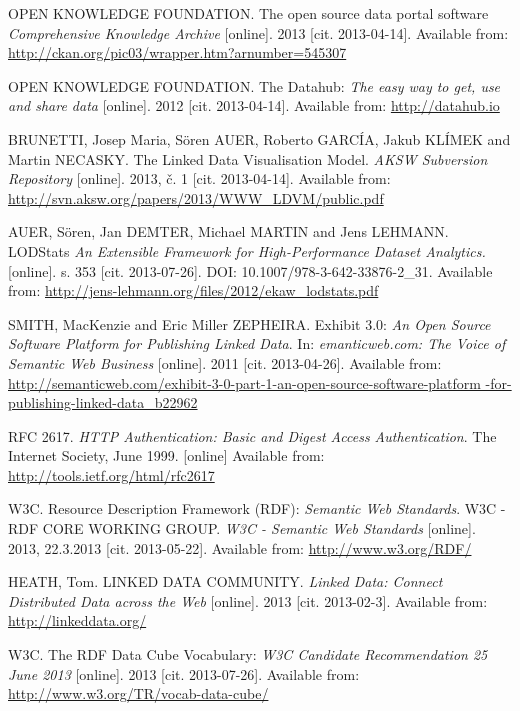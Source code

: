 \begin{thebibliography}{99}
 {\sc OPEN KNOWLEDGE FOUNDATION.}
 The open source data portal software
 \emph{Comprehensive Knowledge Archive}
 [online]. 2013
 [cit. 2013-04-14]. Available from: \url{http://ckan.org/pic03/wrapper.htm?arnumber=545307}

 {\sc OPEN KNOWLEDGE FOUNDATION.}
The Datahub:
 \emph{The easy way to get, use and share data}
 [online]. 2012
 [cit. 2013-04-14]. Available from: \url{http://datahub.io}

 {\sc BRUNETTI,} Josep Maria, Sören AUER, Roberto GARCÍA, Jakub KLÍMEK and Martin NECASKY.
 The Linked Data Visualisation Model.
 \emph{AKSW Subversion Repository} [online]. 2013, č. 1 [cit. 2013-04-14].
 Available from: \url{http://svn.aksw.org/papers/2013/WWW_LDVM/public.pdf}

{\sc AUER,} Sören, Jan DEMTER, Michael MARTIN and Jens LEHMANN. 
LODStats
\emph{An Extensible Framework for High-Performance Dataset Analytics.}
[online]. s. 353 [cit. 2013-07-26]. DOI: 10.1007/978-3-642-33876-2\_31.
Available from: \url{http://jens-lehmann.org/files/2012/ekaw_lodstats.pdf}

{\sc SMITH,} MacKenzie and Eric Miller ZEPHEIRA.
Exhibit 3.0:
\emph{An Open Source Software Platform for Publishing Linked Data}.
In: \emph{emanticweb.com: The Voice of Semantic Web Business} [online].
2011 [cit. 2013-04-26].
Available from: \url{http://semanticweb.com/exhibit-3-0-part-1-an-open-source-software-platform 
-for-publishing-linked-data_b22962}

RFC 2617.
\emph{HTTP Authentication: Basic and Digest Access Authentication}.
The Internet Society, June 1999. [online]
Available from: \url{http://tools.ietf.org/html/rfc2617}

{\sc W3C}. 
Resource Description Framework (RDF): \emph{Semantic Web Standards}.
W3C - RDF CORE WORKING GROUP. 
\emph{W3C - Semantic Web Standards} [online].
2013, 22.3.2013 [cit. 2013-05-22].
Available from: \url{http://www.w3.org/RDF/}

{\sc HEATH,} Tom.
LINKED DATA COMMUNITY. \emph{Linked Data: Connect Distributed Data across the Web}
[online]. 2013 [cit. 2013-02-3]. 
Available from: \url{http://linkeddata.org/}

{\sc W3C.}
The RDF Data Cube Vocabulary:
\emph{W3C Candidate Recommendation 25 June 2013} [online]. 2013
[cit. 2013-07-26]. Available from: \url{http://www.w3.org/TR/vocab-data-cube/}


\end{thebibliography}
